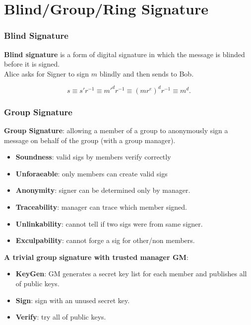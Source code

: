 \section{Blind/Group/Ring Signature}
\begin{frame}\frametitle{Blind Signature}
\textbf{Blind signature} is a form of digital signature in which the message is blinded before it is signed.\\
Alice asks for Signer to sign $m$ blindly and then sends to Bob.
\begin{figure}
\begin{center}

\end{center}
\end{figure}
\[s \equiv s'r^{-1} \equiv m'^dr^{-1} \equiv (mr^e)^dr^{-1} \equiv m^d.\]
\end{frame}
\begin{frame}\frametitle{Group Signature}
\textbf{Group Signature}: allowing a member of a group to anonymously sign a message on behalf of the group (with a group manager).
\begin{itemize}
\item \textbf{Soundness}: valid sigs by members verify correctly
\item \textbf{Unforaeable}: only members can create valid sigs
\item \textbf{Anonymity}: signer can be determined only by manager.
\item \textbf{Traceability}: manager can trace which member signed.
\item \textbf{Unlinkability}: cannot tell if two sigs were from same signer.
\item \textbf{Exculpability}: cannot forge a sig for other/non members.
\end{itemize}
\textbf{A trivial group signature with trusted manager GM}:\\
\begin{itemize}
\item \textbf{KeyGen}: GM generates a secret key list for each member and publishes all of public keys.
\item \textbf{Sign}: sign with an unused secret key.
\item \textbf{Verify}: try all of public keys.
\end{itemize}
\end{frame}
